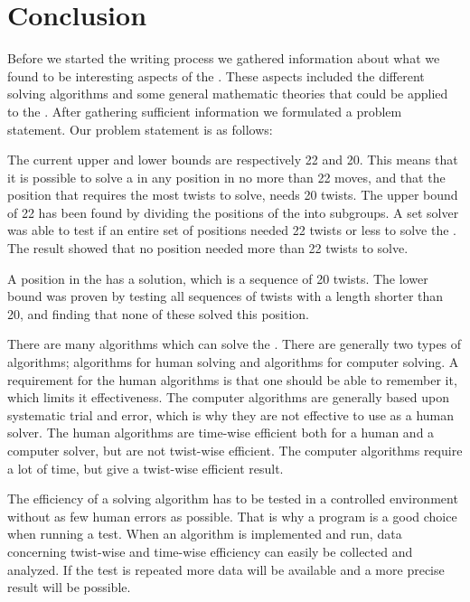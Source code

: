 \chapter{Conclusion}

Before we started the writing process we gathered information about what we found to be interesting aspects of the \rubik{}. 
These aspects included the different solving algorithms and some general mathematic theories that could be applied to the \rubik{}.
After gathering sufficient information we formulated a problem statement. Our problem statement is as follows:


\linebreak

The current upper and lower bounds are respectively 22 and 20. 
This means that it is possible to solve a \rubik{} in any position in no more than 22 moves, and that the \rubik{} position that requires the most twists to solve, needs 20 twists.
The upper bound of 22 has been found by dividing the positions of the \rubik{} into subgroups. A set solver was able to test if an entire set of positions needed 22 twists or less to solve the \rubik{}. The result showed that no \rubik{} position needed more than 22 twists to solve.

A position in the \rubik{} has a solution, which is a sequence of 20 twists. The lower bound was proven by testing all sequences of twists with a length shorter than 20, and finding that none of these solved this position.

There are many algorithms which can solve the \rubik{}. 
There are generally two types of algorithms; algorithms for human solving and algorithms for computer solving. 
A requirement for the human algorithms is that one should be able to remember it, which limits it effectiveness. 
The computer algorithms are generally based upon systematic trial and error, which is why they are not effective to use as a human solver.
The human algorithms are time-wise efficient both for a human and a computer solver, but are not twist-wise efficient.
The computer algorithms require a lot of time, but give a twist-wise efficient result.

The efficiency of a solving algorithm has to be tested in a controlled environment without as few human errors as possible. 
That is why a program is a good choice when running a test.
When an algorithm is implemented and run, data concerning twist-wise and time-wise efficiency can easily be collected and analyzed. 
If the test is repeated more data will be available and a more precise result will be possible.



